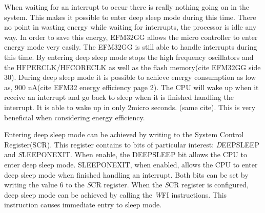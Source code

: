When waiting for an interrupt to occur there is really nothing going on in the system. This makes it possible to enter deep sleep mode during this time. There no point in wasting energy while waiting for interrupts, the processor is idle any way. In order to save this energy, EFM32GG allows the micro controller to enter energy mode very easily. The EFM32GG is still able to handle interrupts during this time. By entering deep sleep mode stops the high frequency oscillators and the HFPERCLK/HFCORECLK as well as the flash memory(cite EFM32GG side 30). During deep sleep mode it is possible to achieve energy consumption as low as, 900 nA(cite EFM32 energy efficiency page 2). The CPU will wake up when it receive an interrupt and go back to sleep when it is finished handling the interrupt. It is able to wake up in only 2micro seconds. (same cite). This is very beneficial when considering energy efficiency.   

Entering deep sleep mode can be achieved by writing to the System Control Register(SCR). This register contains to bits of particular interest: \emph DEEPSLEEP and \emph SLEEPONEXIT. When enable, the DEEPSLEEP bit allows the CPU to enter deep sleep mode. SLEEPONEXIT, when enabled, allows the CPU to enter deep sleep mode when finished handling an interrupt. Both bits can be set by writing the value 6 to the \emph SCR register. When the \emph SCR register is configured, deep sleep mode can be achieved by calling the \emph WFI instructions. This instruction causes immediate entry to sleep mode. 


   


















